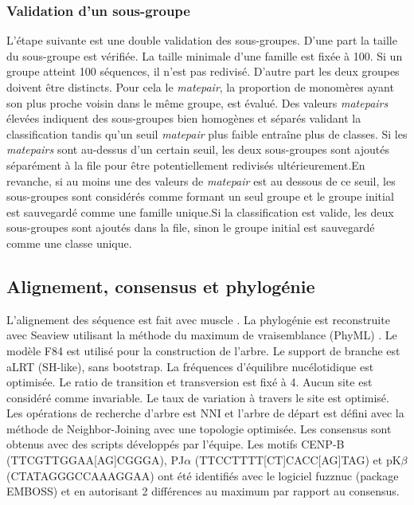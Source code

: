 \documentclass[12pt,a4paper]{article}
\begin{document}
	\subsubsection{Validation d'un sous-groupe}
L'étape suivante est une double validation des sous-groupes. D'une part la taille du sous-groupe est vérifiée. La taille minimale d'une famille est fixée à 100. Si un groupe atteint 100 séquences, il n'est pas redivisé. D'autre part les deux groupes doivent être distincts. Pour cela le \textit{matepair}, la proportion de monomères ayant son plus proche voisin dans le même groupe, est évalué. Des valeurs \textit{matepairs} élevées indiquent des sous-groupes bien homogènes et séparés validant la classification tandis qu’un seuil \textit{matepair} plus faible entraîne plus de classes. Si les \textit{matepairs} sont au-dessus d’un certain seuil, les deux sous-groupes sont ajoutés séparément à la file pour être potentiellement redivisés ultérieurement.En revanche, si au moins une des valeurs de \textit{matepair} est au dessous de ce seuil, les sous-groupes sont considérés comme formant un seul groupe et le groupe initial est sauvegardé comme une famille unique.Si la classification est valide, les deux sous-groupes sont ajoutés dans la file, sinon le groupe initial est sauvegardé comme une classe unique. 

\subsection{Alignement, consensus et phylogénie}
L'alignement des séquence est fait avec muscle \cite{muscle}. La phylogénie est reconstruite avec Seaview 
\cite{seaview} utilisant la méthode du maximum de vraisemblance (PhyML) \cite{phyml}. Le modèle F84 est utilisé pour la construction de l'arbre. Le support de branche est aLRT (SH-like), sans bootstrap. La fréquences d'équilibre nucélotidique est optimisée. Le ratio de transition et transversion est fixé à 4. Aucun site est considéré comme invariable. Le taux de variation à travers le site est optimisé. Les opérations de recherche d'arbre est NNI et l'arbre de départ est défini avec la méthode de Neighbor-Joining \cite{NJ} avec une topologie optimisée.
Les consensus sont obtenus avec des scripts développés par l'équipe. Les motifs CENP-B (TTCGTTGGAA[AG]CGGGA), PJ$\alpha$ (TTCCTTTT[CT]CACC[AG]TAG) et pK$\beta$ (CTATAGGGCCAAAGGAA) ont été identifiés avec le logiciel fuzznuc (package EMBOSS) \cite{emboss} et en autorisant 2 différences au maximum par rapport au consensus. 
\end{document}
